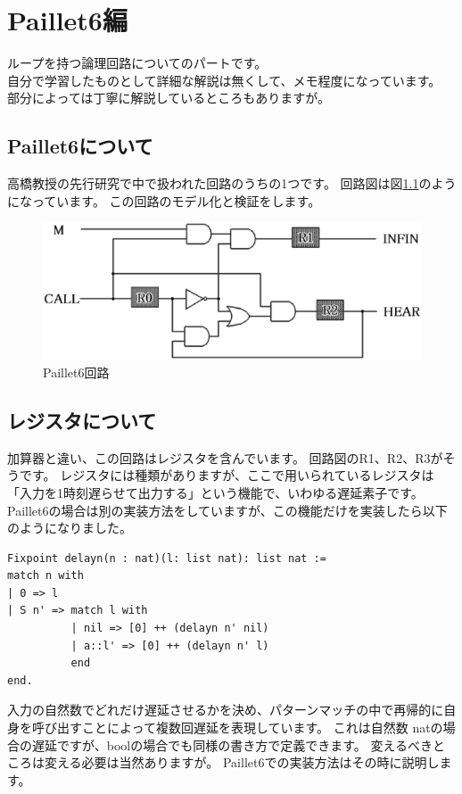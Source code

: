 \documentclass{jsbook}
\begin{document}
\chapter{Paillet6編}
ループを持つ論理回路についてのパートです。\\
自分で学習したものとして詳細な解説は無くして、メモ程度になっています。
部分によっては丁寧に解説しているところもありますが。
\newpage
\section{Paillet6について}
高橋教授の先行研究で中で扱われた回路のうちの1つです。
回路図は図\ref{paillet6}のようになっています。
この回路のモデル化と検証をします。
\begin{figure}[htbp]
\begin{center}
  \includegraphics[width=38zw]{image/Paillet6_AE.eps}
  \caption{Paillet6回路}
  \label{paillet6}
\end{center}
\end{figure}

\section{レジスタについて \label{レジスタ}}
加算器と違い、この回路はレジスタを含んでいます。
回路図のR1、R2、R3がそうです。
レジスタには種類がありますが、ここで用いられているレジスタは「入力を1時刻遅らせて出力する」という機能で、いわゆる遅延素子です。
Paillet6の場合は別の実装方法をしていますが、この機能だけを実装したら以下のようになりました。
\begin{verbatim}
Fixpoint delayn(n : nat)(l: list nat): list nat :=
match n with
| 0 => l
| S n' => match l with
          | nil => [0] ++ (delayn n' nil)
          | a::l' => [0] ++ (delayn n' l)
          end
end.
\end{verbatim}
入力の自然数でどれだけ遅延させるかを決め、パターンマッチの中で再帰的に自身を呼び出すことによって複数回遅延を表現しています。
これは自然数 natの場合の遅延ですが、boolの場合でも同様の書き方で定義できます。
変えるべきところは変える必要は当然ありますが。
Paillet6での実装方法はその時に説明します。
\end{document}
